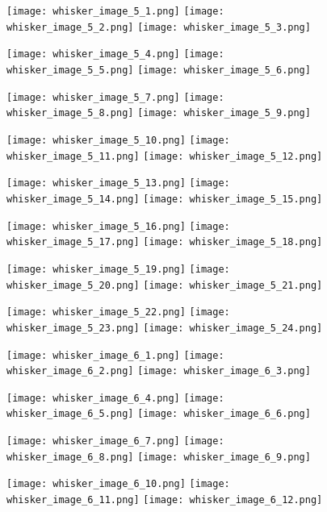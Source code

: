 \documentclass[12pt]{article}
\begin{document}
\begin{figure}
	\centerline{
		\texttt{[image: whisker\_image\_5\_1.png]}
		\texttt{[image: whisker\_image\_5\_2.png]}
		\texttt{[image: whisker\_image\_5\_3.png]}
	}
	\centerline{
		\texttt{[image: whisker\_image\_5\_4.png]}
		\texttt{[image: whisker\_image\_5\_5.png]}
		\texttt{[image: whisker\_image\_5\_6.png]}
	}
	\centerline{
		\texttt{[image: whisker\_image\_5\_7.png]}
		\texttt{[image: whisker\_image\_5\_8.png]}
		\texttt{[image: whisker\_image\_5\_9.png]}
	}
	\centerline{
		\texttt{[image: whisker\_image\_5\_10.png]}
		\texttt{[image: whisker\_image\_5\_11.png]}
		\texttt{[image: whisker\_image\_5\_12.png]}
	}
\end{figure}

\begin{figure}
	\centerline{
		\texttt{[image: whisker\_image\_5\_13.png]}
		\texttt{[image: whisker\_image\_5\_14.png]}
		\texttt{[image: whisker\_image\_5\_15.png]}
	}
	\centerline{
		\texttt{[image: whisker\_image\_5\_16.png]}
		\texttt{[image: whisker\_image\_5\_17.png]}
		\texttt{[image: whisker\_image\_5\_18.png]}
	}
	\centerline{
		\texttt{[image: whisker\_image\_5\_19.png]}
		\texttt{[image: whisker\_image\_5\_20.png]}
		\texttt{[image: whisker\_image\_5\_21.png]}
	}
	\centerline{
		\texttt{[image: whisker\_image\_5\_22.png]}
		\texttt{[image: whisker\_image\_5\_23.png]}
		\texttt{[image: whisker\_image\_5\_24.png]}
	}
\end{figure}

\begin{figure}
	\centerline{
		\texttt{[image: whisker\_image\_6\_1.png]}
		\texttt{[image: whisker\_image\_6\_2.png]}
		\texttt{[image: whisker\_image\_6\_3.png]}
	}
	\centerline{
		\texttt{[image: whisker\_image\_6\_4.png]}
		\texttt{[image: whisker\_image\_6\_5.png]}
		\texttt{[image: whisker\_image\_6\_6.png]}
	}
	\centerline{
		\texttt{[image: whisker\_image\_6\_7.png]}
		\texttt{[image: whisker\_image\_6\_8.png]}
		\texttt{[image: whisker\_image\_6\_9.png]}
	}
	\centerline{
		\texttt{[image: whisker\_image\_6\_10.png]}
		\texttt{[image: whisker\_image\_6\_11.png]}
		\texttt{[image: whisker\_image\_6\_12.png]}
	}
\end{figure}
\end{document}
